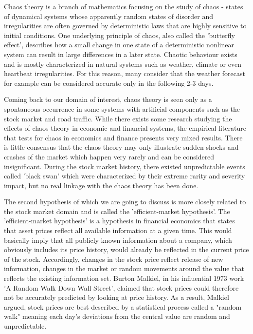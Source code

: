 \vspace{5mm}

Chaos theory is a branch of mathematics focusing on the study of chaos - states of dynamical systems whose apparently random states of disorder and irregularities are often governed by deterministic laws that are highly sensitive to initial conditions. One underlying principle of chaos, also called the 'butterfly effect', describes how a small change in one state of a deterministic nonlinear system can result in large differences in a later state. Chaotic behaviour exists and is mostly characterized in natural systems such as weather, climate or even heartbeat irregularities. For this reason, many consider that the weather forecast for example can be considered accurate only in the following 2-3 days.

Coming back to our domain of interest, chaos theory is seen only as a spontaneous occurrence in some systems with artificial components such as the stock market and road traffic. While there exists some research studying the effects of chaos theory in economic and financial systems, the empirical literature that tests for chaos in economics and finance presents very mixed results.\cite{brooks1998chaos} There is little consensus that the chaos theory may only illustrate sudden shocks and crashes of the market which happen very rarely and can be considered insignificant. During the stock market history, there existed unpredictable events called 'black swan' which were characterized by their extreme rarity and severity impact, but no real linkage with the chaos theory has been done.

\vspace{5mm}

The second hypothesis of which we are going to discuss is more closely related to the stock market domain and is called the 'efficient-market hypothesis'. The 'efficient-market hypothesis' is a hypothesis in financial economics that states that asset prices reflect all available information at a given time. This would basically imply that all publicly known information about a company, which obviously includes its price history, would already be reflected in the current price of the stock. Accordingly, changes in the stock price reflect release of new information, changes in the market or random movements around the value that reflects the existing information set. Burton Malkiel, in his influential 1973 work 'A Random Walk Down Wall Street', claimed that stock prices could therefore not be accurately predicted by looking at price history. As a result, Malkiel argued, stock prices are best described by a statistical process called a "random walk" meaning each day's deviations from the central value are random and unpredictable.

